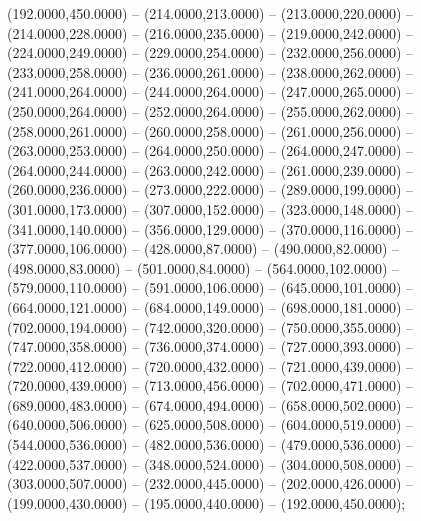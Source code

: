 \begin{scope}[shift={(-191.875,-81.87406)}]
  \begin{scope}[draw=black,fill=c3cad6d,line join=round,line width=0.208pt]
     (192.0000,450.0000) -- (214.0000,213.0000) --
      (213.0000,220.0000) -- (214.0000,228.0000) -- (216.0000,235.0000) --
      (219.0000,242.0000) -- (224.0000,249.0000) -- (229.0000,254.0000) --
      (232.0000,256.0000) -- (233.0000,258.0000) -- (236.0000,261.0000) --
      (238.0000,262.0000) -- (241.0000,264.0000) -- (244.0000,264.0000) --
      (247.0000,265.0000) -- (250.0000,264.0000) -- (252.0000,264.0000) --
      (255.0000,262.0000) -- (258.0000,261.0000) -- (260.0000,258.0000) --
      (261.0000,256.0000) -- (263.0000,253.0000) -- (264.0000,250.0000) --
      (264.0000,247.0000) -- (264.0000,244.0000) -- (263.0000,242.0000) --
      (261.0000,239.0000) -- (260.0000,236.0000) -- (273.0000,222.0000) --
      (289.0000,199.0000) -- (301.0000,173.0000) -- (307.0000,152.0000) --
      (323.0000,148.0000) -- (341.0000,140.0000) -- (356.0000,129.0000) --
      (370.0000,116.0000) -- (377.0000,106.0000) -- (428.0000,87.0000) --
      (490.0000,82.0000) -- (498.0000,83.0000) -- (501.0000,84.0000) --
      (564.0000,102.0000) -- (579.0000,110.0000) -- (591.0000,106.0000) --
      (645.0000,101.0000) -- (664.0000,121.0000) -- (684.0000,149.0000) --
      (698.0000,181.0000) -- (702.0000,194.0000) -- (742.0000,320.0000) --
      (750.0000,355.0000) -- (747.0000,358.0000) -- (736.0000,374.0000) --
      (727.0000,393.0000) -- (722.0000,412.0000) -- (720.0000,432.0000) --
      (721.0000,439.0000) -- (720.0000,439.0000) -- (713.0000,456.0000) --
      (702.0000,471.0000) -- (689.0000,483.0000) -- (674.0000,494.0000) --
      (658.0000,502.0000) -- (640.0000,506.0000) -- (625.0000,508.0000) --
      (604.0000,519.0000) -- (544.0000,536.0000) -- (482.0000,536.0000) --
      (479.0000,536.0000) -- (422.0000,537.0000) -- (348.0000,524.0000) --
      (304.0000,508.0000) -- (303.0000,507.0000) -- (232.0000,445.0000) --
      (202.0000,426.0000) -- (199.0000,430.0000) -- (195.0000,440.0000) --
      (192.0000,450.0000);
  \end{scope}
  \begin{scope}[draw=black,fill=c3cad6d,line join=round,line width=0.208pt]
  \end{scope}
  \begin{scope}[draw=black,fill=c3cad6d,line join=round,line width=0.208pt]
  \end{scope}
  \begin{scope}[draw=black,fill=c3cad6d,line join=round,line width=0.208pt]
  \end{scope}
  \begin{scope}[draw=black,fill=c3cad6d,line join=round,line width=0.208pt]
  \end{scope}
\end{scope}
\begin{scope}[shift={(-191.875,-81.87406)},draw=cff0000,line width=0.800pt]
\end{scope}

